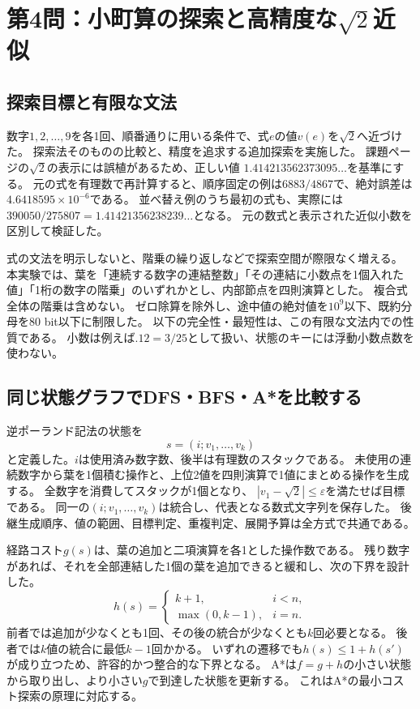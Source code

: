 \section{第4問：小町算の探索と高精度な$\sqrt{2}$近似}
\label{sec:q04}

\subsection{探索目標と有限な文法}
数字$1,2,\ldots,9$を各1回、順番通りに用いる条件で、式$e$の値$v(e)$を$\sqrt{2}$へ近づけた。
探索法そのものの比較と、精度を追求する追加探索を実施した。
課題ページの$\sqrt{2}$の表示には誤植があるため、正しい値
$1.414213562373095\ldots$を基準にする。
元の式を有理数で再計算すると、順序固定の例は$6883/4867$で、絶対誤差は$4.6418595\times10^{-6}$である。
並べ替え例のうち最初の式も、実際には$390050/275807=1.41421356238239\ldots$となる。
元の数式と表示された近似小数を区別して検証した。

式の文法を明示しないと、階乗の繰り返しなどで探索空間が際限なく増える。
本実験では、葉を「連続する数字の連結整数」「その連結に小数点を1個入れた値」「1桁の数字の階乗」のいずれかとし、内部節点を四則演算とした。
複合式全体の階乗は含めない。
ゼロ除算を除外し、途中値の絶対値を$10^9$以下、既約分母を80 bit以下に制限した。
以下の完全性・最短性は、この有限な文法内での性質である。
小数は例えば$.12=3/25$として扱い、状態のキーには浮動小数点数を使わない。

\subsection{同じ状態グラフでDFS・BFS・A*を比較する}
逆ポーランド記法の状態を
\[
 s=(i;v_1,\ldots,v_k)
\]
と定義した。$i$は使用済み数字数、後半は有理数のスタックである。
未使用の連続数字から葉を1個積む操作と、上位2値を四則演算で1値にまとめる操作を生成する。
全数字を消費してスタックが1個となり、
$|v_1-\sqrt{2}|\leq\varepsilon$を満たせば目標である。
同一の$(i;v_1,\ldots,v_k)$は統合し、代表となる数式文字列を保存した。
後継生成順序、値の範囲、目標判定、重複判定、展開予算は全方式で共通である。

経路コスト$g(s)$は、葉の追加と二項演算を各1とした操作数である。
残り数字があれば、それを全部連結した1個の葉を追加できると緩和し、次の下界を設計した。
\[
 h(s)=\begin{cases}
 k+1,&i<n,\\
 \max(0,k-1),&i=n.
 \end{cases}
\]
前者では追加が少なくとも1回、その後の統合が少なくとも$k$回必要となる。
後者では$k$値の統合に最低$k-1$回かかる。
いずれの遷移でも$h(s)\leq1+h(s')$が成り立つため、許容的かつ整合的な下界となる。
A*は$f=g+h$の小さい状態から取り出し、より小さい$g$で到達した状態を更新する。
これはA*の最小コスト探索の原理\cite{hart1968}に対応する。

